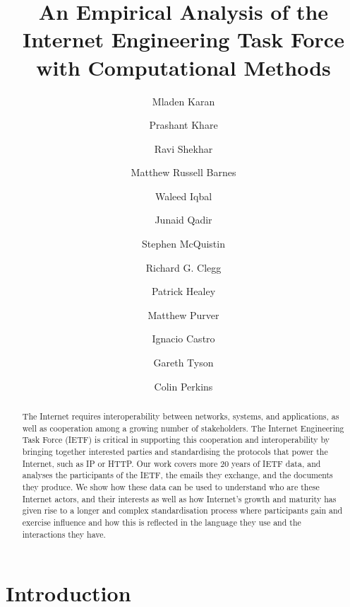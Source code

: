 \documentclass[twocolumn,10pt]{article}
\begin{document}
\title{An Empirical Analysis of the Internet Engineering Task Force 
       with Computational Methods}
\author{Mladen Karan \and
        Prashant Khare \and
        Ravi Shekhar \and
        Matthew Russell Barnes \and
        Waleed Iqbal \and
        Junaid Qadir \and
        Stephen McQuistin \and
        Richard G. Clegg \and
        Patrick Healey \and
        Matthew Purver \and
        Ignacio Castro \and
        Gareth Tyson \and
        Colin Perkins}

\maketitle
\begin{abstract}

  The Internet requires interoperability between networks, systems, and
  applications, as well as cooperation among a growing number of
  stakeholders. The Internet Engineering Task Force (IETF) is critical in
  supporting this cooperation and interoperability by bringing together
  interested parties and standardising the protocols that power the
  Internet, such as IP or HTTP. Our work covers more 20 years of IETF
  data, and analyses the participants of the IETF, the emails they
  exchange, and the documents they produce. We show how these data can be
  used to understand who are these Internet actors, and their interests as
  well as how Internet's growth and maturity has given rise to a longer and
  complex standardisation process where participants gain and exercise
  influence and how this is reflected in the language they use and the
  interactions they have.
  
\end{abstract}
\section{Introduction}

\end{document}
